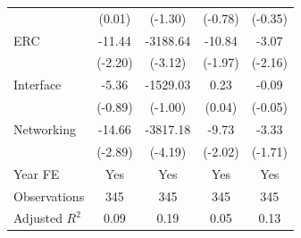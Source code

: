 {\begin{tabular}{l*{4}{c}}
                                   &      (0.01)         &     (-1.30)         &     (-0.78)         &     (-0.35)         \\
[1em]
ERC                                &      -11.44\sym{**} &    -3188.64\sym{***}&      -10.84\sym{**} &       -3.07\sym{**} \\
                                   &     (-2.20)         &     (-3.12)         &     (-1.97)         &     (-2.16)         \\
[1em]
Interface                          &       -5.36         &    -1529.03         &        0.23         &       -0.09         \\
                                   &     (-0.89)         &     (-1.00)         &      (0.04)         &     (-0.05)         \\
[1em]
Networking                         &      -14.66\sym{***}&    -3817.18\sym{***}&       -9.73\sym{**} &       -3.33\sym{*}  \\
                                   &     (-2.89)         &     (-4.19)         &     (-2.02)         &     (-1.71)         \\
[1em]
Year FE                            &         Yes         &         Yes         &         Yes         &         Yes         \\
\hline
Observations                       &         345         &         345         &         345         &         345         \\
Adjusted \(R^{2}\)                 &        0.09         &        0.19         &        0.05         &        0.13         \\
\hline\hline
\end{tabular}
}
